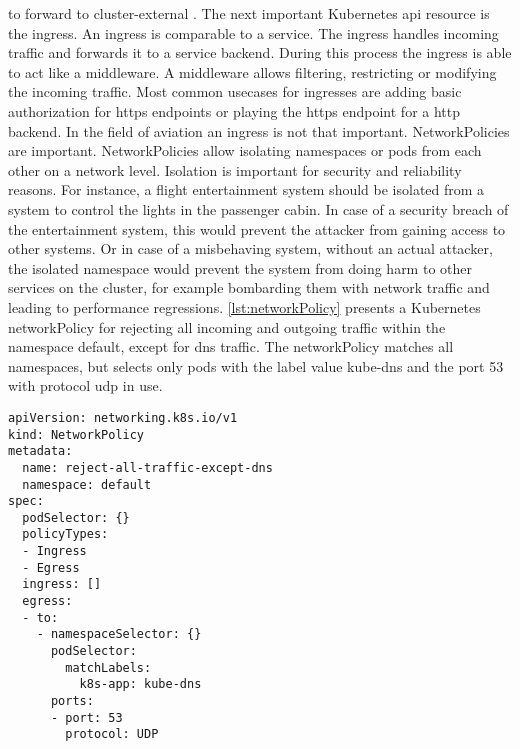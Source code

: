 \documentclass[titlepage]{report}
\begin{document}
to forward to cluster-external . The next important Kubernetes \gls{api} resource is the ingress. An ingress is comparable to a service. The ingress handles incoming
traffic and forwards it to a service backend. During this process the ingress is able to act like a middleware. A middleware allows filtering, restricting or modifying the incoming traffic.
Most common usecases for ingresses are adding basic authorization for \gls{https} endpoints or playing the \gls{https} endpoint for a \gls{http} backend. In the field of aviation an ingress
is not that important.  NetworkPolicies are important. NetworkPolicies allow isolating namespaces or pods from each other on a network level. Isolation is important for security
and reliability reasons. For instance, a flight entertainment system should be isolated from a system to control the lights in the passenger cabin. In case of a security breach
of the entertainment system, this would prevent the attacker from gaining access to other systems. Or in case of a misbehaving system, without an actual attacker, the isolated namespace
would prevent the system from doing harm to other services on the cluster, for example bombarding them with network traffic and leading to performance regressions. \autoref{lst:networkPolicy}
presents a Kubernetes networkPolicy for rejecting all incoming and outgoing traffic within the namespace default, except for \gls{dns} traffic. The networkPolicy matches
all namespaces, but selects only pods with the label value kube-dns and the port 53 with protocol \gls{udp} in use.
\begin{minipage}{\linewidth}
\begin{lstlisting}[caption={Example networkPolicy that rejects all traffic in a namespace except for DNS requests},label={lst:networkPolicy}]
apiVersion: networking.k8s.io/v1
kind: NetworkPolicy
metadata:
  name: reject-all-traffic-except-dns
  namespace: default
spec:
  podSelector: {}
  policyTypes:
  - Ingress
  - Egress
  ingress: []
  egress:
  - to:
    - namespaceSelector: {}
      podSelector:
        matchLabels:
          k8s-app: kube-dns
      ports:
      - port: 53
        protocol: UDP
\end{lstlisting}
\end{minipage}
\end{document}
